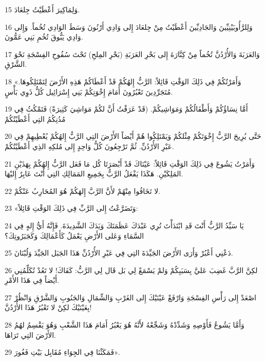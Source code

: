 \par 15 وَلِمَاكِيرَ أَعْطَيْتُ جِلعَادَ.
\par 16 وَلِلرَّأُوبَيْنِيِّينَ وَالجَادِيِّينَ أَعْطَيْتُ مِنْ جِلعَادَ إِلى وَادِي أَرْنُونَ وَسَطَ الوَادِي تُخُماً. وَإِلى وَادِي يَبُّوقَ تُخُمِ بَنِي عَمُّونَ.
\par 17 وَالعَرَبَةَ وَالأُرْدُنَّ تُخُماً مِنْ كِنَّارَةَ إِلى بَحْرِ العَرَبَةِ (بَحْرِ المِلحِ) تَحْتَ سُفُوحِ الفِسْجَةِ نَحْوَ الشَّرْقِ.
\par 18 «وَأَمَرْتُكُمْ فِي ذَلِكَ الوَقْتِ قَائِلاً: الرَّبُّ إِلهُكُمْ قَدْ أَعْطَاكُمْ هَذِهِ الأَرْضَ لِتَمْتَلِكُوهَا. مُتَجَرِّدِينَ تَعْبُرُونَ أَمَامَ إِخْوَتِكُمْ بَنِي إِسْرَائِيل كُلُّ ذَوِي بَأْسٍ.
\par 19 أَمَّا نِسَاؤُكُمْ وَأَطْفَالُكُمْ وَمَوَاشِيكُمْ. (قَدْ عَرَفْتُ أَنَّ لكُمْ مَوَاشِيَ كَثِيرَةً) فَتَمْكُثُ فِي مُدُنِكُمُ التِي أَعْطَيْتُكُمْ
\par 20 حَتَّى يُرِيحَ الرَّبُّ إِخْوَتَكُمْ مِثْلكُمْ وَيَمْتَلِكُوا هُمْ أَيْضاً الأَرْضَ التِي الرَّبُّ إِلهُكُمْ يُعْطِيهِمْ فِي عَبْرِ الأُرْدُنِّ. ثُمَّ تَرْجِعُونَ كُلُّ وَاحِدٍ إِلى مُلكِهِ الذِي أَعْطَيْتُكُمْ.
\par 21 وَأَمَرْتُ يَشُوعَ فِي ذَلِكَ الوَقْتِ قَائِلاً: عَيْنَاكَ قَدْ أَبْصَرَتَا كُل مَا فَعَل الرَّبُّ إِلهُكُمْ بِهَذَيْنِ المَلِكَيْنِ. هَكَذَا يَفْعَلُ الرَّبُّ بِجَمِيعِ المَمَالِكِ التِي أَنْتَ عَابِرٌ إِليْهَا.
\par 22 لا تَخَافُوا مِنْهُمْ لأَنَّ الرَّبَّ إِلهَكُمْ هُوَ المُحَارِبُ عَنْكُمْ.
\par 23 «وَتَضَرَّعْتُ إِلى الرَّبِّ فِي ذَلِكَ الوَقْتِ قَائِلاً:
\par 24 يَا سَيِّدُ الرَّبُّ أَنْتَ قَدِ ابْتَدَأْتَ تُرِي عَبْدَكَ عَظَمَتَكَ وَيَدَكَ الشَّدِيدَةَ. فَإِنَّهُ أَيُّ إِلهٍ فِي السَّمَاءِ وَعَلى الأَرْضِ يَعْمَلُ كَأَعْمَالِكَ وَكَجَبَرُوتِكَ؟
\par 25 دَعْنِي أَعْبُرْ وَأَرَى الأَرْضَ الجَيِّدَةَ التِي فِي عَبْرِ الأُرْدُنِّ هَذَا الجَبَل الجَيِّدَ وَلُبْنَانَ.
\par 26 لكِنَّ الرَّبَّ غَضِبَ عَليَّ بِسَبَبِكُمْ وَلمْ يَسْمَعْ لِي بَل قَال لِي الرَّبُّ: كَفَاكَ! لا تَعُدْ تُكَلِّمُنِي أَيْضاً فِي هَذَا الأَمْرِ.
\par 27 اصْعَدْ إِلى رَأْسِ الفِسْجَةِ وَارْفَعْ عَيْنَيْكَ إِلى الغَرْبِ وَالشِّمَالِ وَالجَنُوبِ وَالشَّرْقِ وَانْظُرْ بِعَيْنَيْكَ لكِنْ لا تَعْبُرُ هَذَا الأُرْدُنَّ!
\par 28 وَأَمَّا يَشُوعُ فَأَوْصِهِ وَشَدِّدْهُ وَشَجِّعْهُ لأَنَّهُ هُوَ يَعْبُرُ أَمَامَ هَذَا الشَّعْبِ وَهُوَ يَقْسِمُ لهُمُ الأَرْضَ التِي تَرَاهَا.
\par 29 فَمَكَثْنَا فِي الجِوَاءِ مُقَابِل بَيْتِ فَغُورَ».

